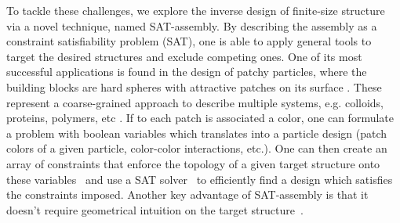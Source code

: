 \documentclass[a4paper, amsfonts, amssymb, amsmath, reprint, showkeys, nofootinbib, oneside]{revtex4-1}
\begin{document}
To tackle these challenges, we explore the inverse design of finite-size structure via a novel technique, named SAT-assembly\cite{Romano2020a,Russo2022}. By describing the assembly as a constraint satisfiability problem (SAT), one is able to apply general tools to target the desired structures and exclude competing ones. One of its most successful applications is found in the design of patchy particles, where the building blocks are hard spheres with attractive patches on its surface \cite{Bianchi2006, Romano2010, Rovigatti2018, Russo2021, Sciortino2009}. These represent a coarse-grained approach to describe multiple systems, e.g. colloids, proteins, polymers, etc \cite{Sacanna2011, Wang2012}. If to each patch is associated a color, one can formulate a problem with boolean variables which translates into a particle design (patch colors of a given particle, color-color interactions, etc.). One can then create an array of constraints that enforce the topology of a given target structure onto these variables~\cite{Russo2022} and use a SAT solver~\cite{Een2005} to efficiently find a design which satisfies the constraints imposed.
Another key advantage of SAT-assembly is that it doesn't require geometrical intuition on the target structure~\textcolor{blue}{\cite{rapaport2004self}}.
\end{document}
